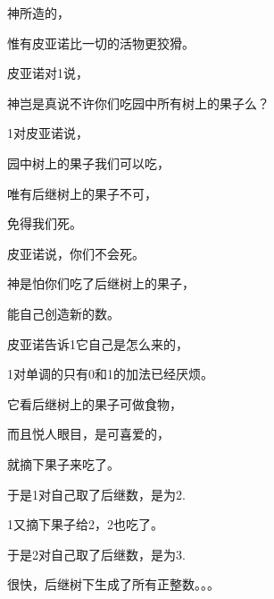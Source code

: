 \begin{centering}
神所造的，

惟有皮亚诺比一切的活物更狡猾。

皮亚诺对1说，

神岂是真说不许你们吃园中所有树上的果子么？

1对皮亚诺说，

园中树上的果子我们可以吃，

唯有后继树上的果子不可，

免得我们死。

皮亚诺说，你们不会死。

神是怕你们吃了后继树上的果子，

能自己创造新的数。\vsp

皮亚诺告诉1它自己是怎么来的，

1对单调的只有0和1的加法已经厌烦。

它看后继树上的果子可做食物，

而且悦人眼目，是可喜爱的，

就摘下果子来吃了。\vsp

于是1对自己取了后继数，是为2.

1又摘下果子给2，2也吃了。

于是2对自己取了后继数，是为3.

很快，后继树下生成了所有正整数。。。

\end{centering}






